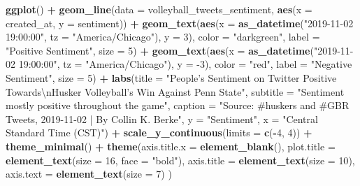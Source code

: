 \documentclass[
]{book}
\newenvironment{Shaded}{\begin{snugshade}}{\end{snugshade}}
\newcommand{\CharTok}[1]{\textcolor[rgb]{0.31,0.60,0.02}{#1}}
\newcommand{\DataTypeTok}[1]{\textcolor[rgb]{0.13,0.29,0.53}{#1}}
\newcommand{\DecValTok}[1]{\textcolor[rgb]{0.00,0.00,0.81}{#1}}
\newcommand{\KeywordTok}[1]{\textcolor[rgb]{0.13,0.29,0.53}{\textbf{#1}}}
\newcommand{\NormalTok}[1]{#1}
\newcommand{\OperatorTok}[1]{\textcolor[rgb]{0.81,0.36,0.00}{\textbf{#1}}}
\newcommand{\StringTok}[1]{\textcolor[rgb]{0.31,0.60,0.02}{#1}}
\begin{document}
\begin{Shaded}
\begin{Highlighting}[]
\KeywordTok{ggplot}\NormalTok{() }\OperatorTok{+}
\StringTok{  }\KeywordTok{geom_line}\NormalTok{(}\DataTypeTok{data =}\NormalTok{ volleyball_tweets_sentiment, }\KeywordTok{aes}\NormalTok{(}\DataTypeTok{x =}\NormalTok{ created_at, }\DataTypeTok{y =}\NormalTok{ sentiment)) }\OperatorTok{+}
\StringTok{  }\KeywordTok{geom_text}\NormalTok{(}\KeywordTok{aes}\NormalTok{(}\DataTypeTok{x =} \KeywordTok{as_datetime}\NormalTok{(}\StringTok{"2019-11-02 19:00:00"}\NormalTok{, }\DataTypeTok{tz =} \StringTok{"America/Chicago"}\NormalTok{), }\DataTypeTok{y =} \DecValTok{3}\NormalTok{), }\DataTypeTok{color =} \StringTok{"darkgreen"}\NormalTok{, }\DataTypeTok{label =} \StringTok{"Positive Sentiment"}\NormalTok{, }\DataTypeTok{size =} \DecValTok{5}\NormalTok{) }\OperatorTok{+}
\StringTok{  }\KeywordTok{geom_text}\NormalTok{(}\KeywordTok{aes}\NormalTok{(}\DataTypeTok{x =} \KeywordTok{as_datetime}\NormalTok{(}\StringTok{"2019-11-02 19:00:00"}\NormalTok{, }\DataTypeTok{tz =} \StringTok{"America/Chicago"}\NormalTok{), }\DataTypeTok{y =} \DecValTok{-3}\NormalTok{), }\DataTypeTok{color =} \StringTok{"red"}\NormalTok{, }\DataTypeTok{label =} \StringTok{"Negative Sentiment"}\NormalTok{, }\DataTypeTok{size =} \DecValTok{5}\NormalTok{) }\OperatorTok{+}
\StringTok{  }\KeywordTok{labs}\NormalTok{(}\DataTypeTok{title =} \StringTok{"People's Sentiment on Twitter Positive Towards}\CharTok{\textbackslash{}n}\StringTok{Husker Volleyball's Win Against Penn State"}\NormalTok{,}
       \DataTypeTok{subtitle =} \StringTok{"Sentiment mostly positive throughout the game"}\NormalTok{,}
       \DataTypeTok{caption =} \StringTok{"Source: #huskers and #GBR Tweets, 2019-11-02 | By Collin K. Berke"}\NormalTok{,}
       \DataTypeTok{y =} \StringTok{"Sentiment"}\NormalTok{,}
       \DataTypeTok{x =} \StringTok{"Central Standard Time (CST)"}\NormalTok{) }\OperatorTok{+}\StringTok{ }
\StringTok{  }\KeywordTok{scale_y_continuous}\NormalTok{(}\DataTypeTok{limits =} \KeywordTok{c}\NormalTok{(}\OperatorTok{-}\DecValTok{4}\NormalTok{, }\DecValTok{4}\NormalTok{)) }\OperatorTok{+}
\StringTok{  }\KeywordTok{theme_minimal}\NormalTok{() }\OperatorTok{+}
\StringTok{  }\KeywordTok{theme}\NormalTok{(}\DataTypeTok{axis.title.x =} \KeywordTok{element_blank}\NormalTok{(),}
        \DataTypeTok{plot.title =} \KeywordTok{element_text}\NormalTok{(}\DataTypeTok{size =} \DecValTok{16}\NormalTok{, }\DataTypeTok{face =} \StringTok{"bold"}\NormalTok{),}
    \DataTypeTok{axis.title =} \KeywordTok{element_text}\NormalTok{(}\DataTypeTok{size =} \DecValTok{10}\NormalTok{),}
    \DataTypeTok{axis.text =} \KeywordTok{element_text}\NormalTok{(}\DataTypeTok{size =} \DecValTok{7}\NormalTok{)}
\NormalTok{        )}
\end{Highlighting}
\end{Shaded}
\end{document}
